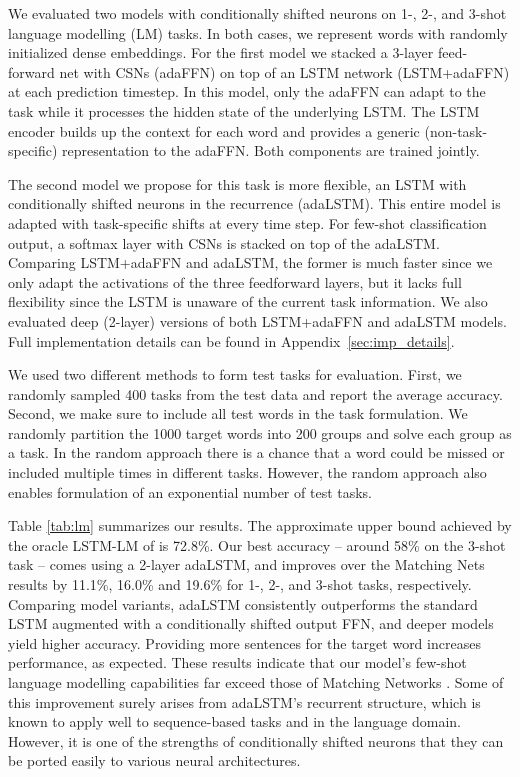 \documentclass{article}
\begin{document}
We evaluated two models with conditionally shifted neurons on 1-, 2-, and 3-shot language modelling (LM) tasks. In both cases, we represent words with randomly initialized dense embeddings. For the first model we stacked a 3-layer feed-forward net with CSNs (adaFFN) on top of an LSTM network (LSTM+adaFFN) at each prediction timestep. In this model, only the adaFFN can adapt to the task while it processes the hidden state of the underlying LSTM. The LSTM encoder builds up the context for each word and provides a generic (non-task-specific) representation to the adaFFN. Both components are trained jointly.

The second model we propose for this task is more flexible, an LSTM with conditionally shifted neurons in the recurrence (adaLSTM). This entire model is adapted with task-specific shifts at every time step. For few-shot classification output, a softmax layer with CSNs is stacked on top of the adaLSTM. Comparing LSTM+adaFFN and adaLSTM, the former is much faster since we only adapt the activations of the three feedforward layers, but it lacks full flexibility since the LSTM is unaware of the current task information. We also evaluated deep (2-layer) versions of both LSTM+adaFFN and adaLSTM models. Full implementation details can be found in Appendix~\ref{sec:imp_details}.

We used two different methods to form test tasks for evaluation. First, we randomly sampled 400 tasks from the test data and report the average accuracy. Second, we make sure to include all test words in the task formulation. We randomly partition the 1000 target words into 200 groups and solve each group as a task. In the random approach there is a chance that a word could be missed or included multiple times in different tasks. However, the random approach also enables formulation of an exponential number of test tasks.

Table \ref{tab:lm} summarizes our results. The approximate upper bound achieved by the oracle LSTM-LM of \citet{vinyals2016matching} is 72.8\%. Our best accuracy -- around 58\% on the 3-shot task -- comes using a 2-layer adaLSTM, and improves over the Matching Nets results by 11.1\%, 16.0\% and 19.6\% for 1-, 2-, and 3-shot tasks, respectively. Comparing model variants, adaLSTM consistently outperforms the standard LSTM augmented with a conditionally shifted output FFN, and deeper models yield higher accuracy. Providing more sentences for the target word increases performance, as expected.
These results indicate that our model's few-shot language modelling capabilities far exceed those of Matching Networks \cite{vinyals2016matching}. Some of this improvement surely arises from adaLSTM's recurrent structure, which is known to apply well to sequence-based tasks and in the language domain. However, it is one of the strengths of conditionally shifted neurons that they can be ported easily to various neural architectures.
\end{document}
